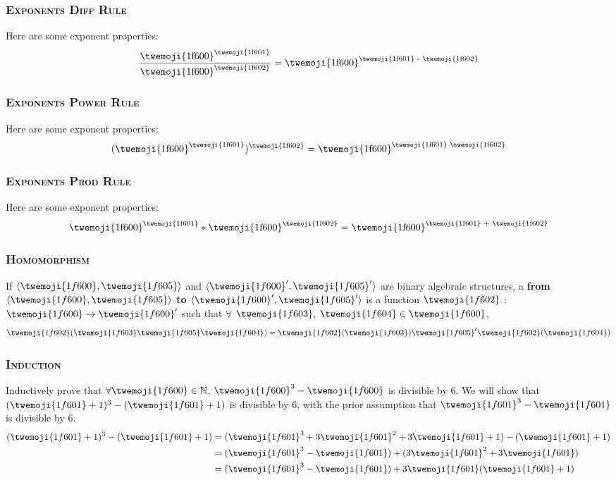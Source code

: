 \documentclass{article}
\begin{document}
\subsubsection{\textsc{Exponents Diff Rule}}
Here are some exponent properties:\begin{equation*}\frac{\text{\twemoji{1f600}}^{\text{\twemoji{1f601}}}}{\text{\twemoji{1f600}}^{\text{\twemoji{1f602}}}} = \text{\twemoji{1f600}}^{\text{\twemoji{1f601} - \twemoji{1f602}}}
\end{equation*}
\subsubsection{\textsc{Exponents Power Rule}}
Here are some exponent properties:\begin{equation*}(\text{\twemoji{1f600}}^{\text{\twemoji{1f601}}})^{\text{\twemoji{1f602}}} = \text{\twemoji{1f600}}^{\text{\twemoji{1f601} \twemoji{1f602}}}
\end{equation*}
\subsubsection{\textsc{Exponents Prod Rule}}
Here are some exponent properties:\begin{equation*}\text{\twemoji{1f600}}^{\text{\twemoji{1f601}}} * \text{\twemoji{1f600}}^{\text{\twemoji{1f602}}} = \text{\twemoji{1f600}}^{\text{\twemoji{1f601} + \twemoji{1f602}}}
\end{equation*}
\subsubsection{\textsc{Homomorphism}}
If $\langle \twemoji{1f600},\twemoji{1f605}\rangle$ and $\langle \twemoji{1f600}',\twemoji{1f605}'\rangle$ are binary algebraic structures, a \textbf{ from $\langle \twemoji{1f600},\twemoji{1f605}\rangle$ to $\langle \twemoji{1f600}',\twemoji{1f605}'\rangle$} is a function $\twemoji{1f602}$ : $\twemoji{1f600}\rightarrow \twemoji{1f600}'$ such that $\forall$ $\twemoji{1f603}$, $\twemoji{1f604}\in \twemoji{1f600}$,\begin{equation*}\twemoji{1f602}(\twemoji{1f603}\twemoji{1f605} \twemoji{1f604}) = \twemoji{1f602}(\twemoji{1f603}) \twemoji{1f605}'\twemoji{1f602}(\twemoji{1f604})
\end{equation*}
\subsubsection{\textsc{Induction}}
Inductively prove that $\forall \twemoji{1f600}\in\mathbb{N}$, $\twemoji{1f600}^3 - \twemoji{1f600}$ is divisible by 6. We will show that $(\twemoji{1f601}+1)^3 - (\twemoji{1f601}+1)$ is divisible by 6, with the prior assumption that $\twemoji{1f601}^3 - \twemoji{1f601}$ is divisible by 6.\begin{align*}(\twemoji{1f601}+1)^3 - (\twemoji{1f601} + 1) &= (\twemoji{1f601}^3 +3\twemoji{1f601}^2 + 3\twemoji{1f601} + 1) - (\twemoji{1f601} + 1)\\&= (\twemoji{1f601}^3 - \twemoji{1f601}) + (3\twemoji{1f601}^2 + 3\twemoji{1f601})\\&= (\twemoji{1f601}^3 - \twemoji{1f601}) + 3\twemoji{1f601}(\twemoji{1f601}+1)
\end{align*}
\end{document}
